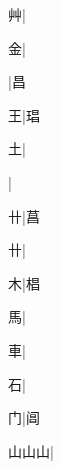 \begin{multicols}{2}
{{\cjk{}{\cnsym{}　}{\cnsym{}　}艸}|{}\par
{\cjk{}{\cnsym{}　}{\cnsym{}　}金}|{}\par
\null\par
{\cjk{}{\cnsym{}　}{\cnsym{}　}{\cnsym{}　}}\mktsJzrVerticalBar{}{\cjk{}{\cnsym{}　}{\cnsym{}　}{\cnsym{}　}}|{\cjk{}昌}\par
{\cjk{}{\cnsym{}　}{\cnsym{}　}王}\mktsJzrVerticalBar{}{\cjk{}{\cnsym{}　}{\cnsym{}　}{\cnsym{}　}}|{\cjk{}琩}\par
{\cjk{}{\cnsym{}　}{\cnsym{}　}土}\mktsJzrVerticalBar{}{\cjk{}{\cnsym{}　}{\cnsym{}　}{\cnsym{}　}}|{}\par
{}\mktsJzrVerticalBar{}{\cjk{}{\cnsym{}　}{\cnsym{}　}{\cnsym{}　}}|{}\par
{\cjk{}{\cnsym{}　}{\cnsym{}　}卄}\mktsJzrVerticalBar{}{\cjk{}{\cnsym{}　}{\cnsym{}　}{\cnsym{}　}}|{\cjk{}菖}\par
{卄}\mktsJzrVerticalBar{}{\cjk{}{\cnsym{}　}{\cnsym{}　}{\cnsym{}　}}|{}\par
{\cjk{}{\cnsym{}　}{\cnsym{}　}木}\mktsJzrVerticalBar{}{\cjk{}{\cnsym{}　}{\cnsym{}　}{\cnsym{}　}}|{\cjk{}椙}\par
{\cjk{}{\cnsym{}　}{\cnsym{}　}馬}\mktsJzrVerticalBar{}{\cjk{}{\cnsym{}　}{\cnsym{}　}{\cnsym{}　}}|{}\par
{\cjk{}{\cnsym{}　}{\cnsym{}　}車}\mktsJzrVerticalBar{}{\cjk{}{\cnsym{}　}{\cnsym{}　}{\cnsym{}　}}|{}\par
{\cjk{}{\cnsym{}　}{\cnsym{}　}石}\mktsJzrVerticalBar{}{\cjk{}{\cnsym{}　}{\cnsym{}　}{\cnsym{}　}}|{}\par
{\cjk{}{\cnsym{}　}{\cnsym{}　}门}\mktsJzrVerticalBar{}{\cjk{}{\cnsym{}　}{\cnsym{}　}{\cnsym{}　}}|{\cjk{}阊}\par
{\cjk{}山山山}\mktsJzrVerticalBar{}{\cjk{}{\cnsym{}　}{\cnsym{}　}{\cnsym{}　}}|{}\par
}
\end{multicols}
